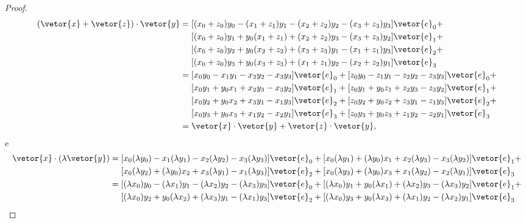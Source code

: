 \begin{proof}
\begin{align*}
        (\vetor{x}+\vetor{z})\cdot\vetor{y} &=
        [(x_0 + z_0) y_0 - (x_1 + z_1) y_1 - (x_2 + z_2)y_2 - (x_3 + z_3)y_3]\vetor{e}_0 +\\
                                            &\mathrel{\phantom{=}}[(x_0 + z_0)y_1 + y_0 (x_1 + z_1) + (x_2 + z_2)y_3 - (x_3 + z_3) y_2]\vetor{e}_1 + \\
                                            &\mathrel{\phantom{=}}[(x_0 + z_0)y_2 + y_0(x_2 + z_2) + (x_3 + z_3)y_1 - (x_1 + z_1)y_3]\vetor{e}_2 +\\
                                            &\mathrel{\phantom{=}}[(x_0 + z_0)y_3 + y_0(x_3 + z_3) + (x_1 + z_1)y_2 - (x_2 + z_2)y_1]\vetor{e}_3\\
                                            &= [x_0 y_0 - x_1 y_1 - x_2y_2 - x_3y_3]\vetor{e}_0 + [z_0 y_0 - z_1 y_1 - z_2y_2 - z_3y_3]\vetor{e}_0 +\\
                                            &\mathrel{\phantom{=}}[x_0y_1 + y_0 x_1 + x_2y_3 - x_3 y_2]\vetor{e}_1 + [z_0y_1 + y_0 z_1 + z_2y_3 - z_3 y_2]\vetor{e}_1 +\\
                                            &\mathrel{\phantom{=}}[x_0y_2 + y_0x_2 + x_3y_1 - x_1y_3]\vetor{e}_2 + [z_0y_2 + y_0z_2 + z_3y_1 - z_1y_3]\vetor{e}_2 +\\
                                            &\mathrel{\phantom{=}}[x_0y_3 + y_0x_3 + x_1y_2 - x_2y_1]\vetor{e}_3+ [z_0y_3 + y_0z_3 + z_1y_2 - z_2y_1]\vetor{e}_3\\
                                            &= \vetor{x}\cdot\vetor{y} + \vetor{z}\cdot\vetor{y},
    \end{align*}
    e
    \begin{align*}
        \vetor{x}\cdot(\lambda\vetor{y}) &= [x_0 (\lambda y_0) - x_1 (\lambda y_1) - x_2(\lambda y_2) - x_3(\lambda y_3)]\vetor{e}_0 + [x_0(\lambda y_1) + (\lambda y_0)x_1 + x_2(\lambda y_3) - x_3 (\lambda y_2)]\vetor{e}_1 + \\
                                         &\mathrel{\phantom{=}} [x_0(\lambda y_2) + (\lambda y_0)x_2 + x_3(\lambda y_1) - x_1(\lambda y_3)]\vetor{e}_2 + [x_0(\lambda y_3) + (\lambda y_0)x_3 + x_1(\lambda y_2) - x_2(\lambda y_1)]\vetor{e}_3\\
                                         &= [(\lambda x_0) y_0 - (\lambda x_1) y_1 - (\lambda x_2)y_2 - (\lambda x_3)y_3]\vetor{e}_0 + [(\lambda x_0)y_1 + y_0(\lambda x_1) + (\lambda x_2)y_3 - (\lambda x_3) y_2]\vetor{e}_1 + \\
                                         &\mathrel{\phantom{=}} [(\lambda x_0)y_2 + y_0(\lambda x_2) + (\lambda x_3)y_1 - (\lambda x_1)y_3]\vetor{e}_2 + [(\lambda x_0)y_3 + y_0(\lambda x_3) + (\lambda x_1)y_2 - (\lambda x_2)y_1]\vetor{e}_3\\

\end{align*}
\end{proof}
